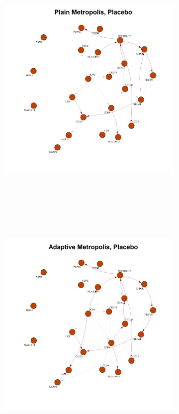 \documentclass{report}
\begin{document}
\begin{figure}[!ht]
{\begin{minipage}{\textwidth}
				\begin{subfigure}[b]{0.45\textwidth}   
					\centering
					\includegraphics[width=\textwidth, height=12cm]{Figures/Application/analysis/net_plain_placebo.png}
					\label{fig:net_plain_placebo}
				\end{subfigure}
				\hspace{0.35cm}  %
				\begin{subfigure}[b]{0.45\textwidth}   
					\centering
					\includegraphics[width=\textwidth, height=12cm]{Figures/Application/analysis/net_ad_placebo.png}

\end{subfigure}
\end{minipage}}
\end{figure}
\end{document}
